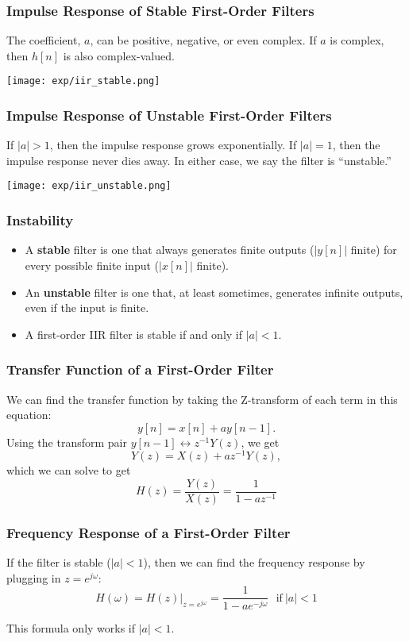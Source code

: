 \documentclass{beamer}
\begin{document}
\begin{frame}
  \frametitle{Impulse Response of Stable First-Order Filters}

  The coefficient, $a$, can be positive, negative, or even complex.
  If $a$ is complex, then $h[n]$ is also complex-valued.
  \centerline{\texttt{[image: exp/iir\_stable.png]}}

\end{frame}

\begin{frame}
  \frametitle{Impulse Response of Unstable First-Order Filters}

  If $|a|>1$, then the impulse response grows exponentially.  If
  $|a|=1$, then the impulse response never dies away.  In either case,
  we say the filter is ``unstable.''
  \centerline{\texttt{[image: exp/iir\_unstable.png]}}

\end{frame}

\begin{frame}
  \frametitle{Instability}

  \begin{itemize}
  \item A {\bf stable} filter is one that always generates finite
    outputs ($|y[n]|$ finite) for every possible finite input
    ($|x[n]|$ finite).
  \item An {\bf unstable} filter is one that, at least sometimes,
    generates infinite outputs, even if the input is finite.
  \item A first-order IIR filter is stable if and only if $|a|<1$.
  \end{itemize}
\end{frame}


\begin{frame}
  \frametitle{Transfer Function of a First-Order Filter}

  We can find the transfer function by taking the Z-transform of each
  term in this equation:
  \[
  y[n] = x[n] + ay[n-1].
  \]
  Using the transform pair $y[n-1]\leftrightarrow z^{-1}Y(z)$, we get
  \[
  Y(z) = X(z)+az^{-1} Y(z),
  \]
  which we can solve to get
  \[
  H(z)  = \frac{Y(z)}{X(z)} = \frac{1}{1-az^{-1}}
  \]
\end{frame}

\begin{frame}
  \frametitle{Frequency Response of a  First-Order Filter}

  If the filter is stable ($|a|<1$), then 
  we can find the frequency response by plugging in $z=e^{j\omega}$:
  \[
  H(\omega) = H(z)\vert_{z=e^{j\omega}}  =  \frac{1}{1-ae^{-j\omega}}~~~\mbox{if}~|a|<1
  \]

  This formula only works if $|a|<1$.
\end{frame}
\end{document}
